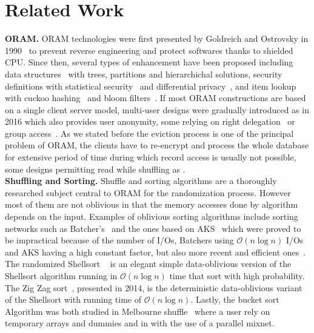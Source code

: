 \documentclass{llncs}
\begin{document}
\section{Related Work}\label{Related}
\noindent\textbf{ORAM.}
ORAM technologies were first presented by Goldreich and Ostrovsky in 1990~\cite{ostrovsky1990efficient} to prevent reverse engineering and protect softwares thanks to shielded CPU.
Since then, several types of enhancement have been proposed including data structures~\cite{goldreich1996software,stefanov2011towards,stefanov2013path,ren2014ring} with trees, partitions and hierarchichal solutions,
security definitions with statistical security~\cite{damgaard2011perfectly,ajtai2010oblivious} and differential privacy~\cite{wagh2016root}, and item lookup with cuckoo hashing~\cite{pinkas2010oblivious} and bloom filters~\cite{williams2008building}.
If most ORAM constructions are based on a single client server model, multi-user designs were gradually introduced as \cite{backesanonymous} in 2016 which also provides user anonymity, some relying on right delegation~\cite{franz2011oblivious} or group access~\cite{goodrich2012privacy}.
As we stated before the eviction process is one of the principal problem of ORAM, the clients have to re-encrypt and process the whole database for extensive period of time during which record access is usually not possible, some designs permitting read while shuffling as \cite{boneh2011}.\\

\noindent\textbf{Shuffling and Sorting.}
Shuffle and sorting algorithms are a thoroughly researched subject central to ORAM for the randomization process. However most of them are not oblivious in that the memory accesses done by algorithm depends on the input.
Examples of oblivious sorting algorithms include sorting networks such as Batcher's~\cite{batcher1968sorting} and the ones based on AKS~\cite{ajtai19830} which were proved to be impractical because of the number of I/Os, Batchers using $\mathcal{O}\left ( n \log n \right)$ I/Os and AKS having a high constant factor, but also more recent and efficient ones~\cite{paterson1990improved}.
The randomized Shellsort ~\cite{goodrich2010randomized} is an elegant simple data-oblivious version of the Shellsort algorithm running in $\mathcal{O}\left ( n \log n \right)$ time that sort with high probability.
The Zig Zag sort~\cite{goodrich2014zig}, presented in 2014, is the deterministic data-oblivious variant of the Shellsort with running time of $\mathcal{O}\left ( n \log n\right)$.
Lastly, the bucket sort Algorithm was both studied in Melbourne shuffle~\cite{ohrimenko2014melbourne} where a user rely on temporary arrays and dummies and in \cite{goodrich2012anonymous} with the use of a parallel mixnet.\\
\end{document}
